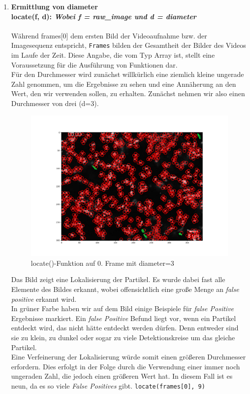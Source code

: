 	\begin{enumerate}
    			\item {\large \textbf{Ermittlung von diameter} \label{kap3_Ermittlung_diameter}}\\
    			\textbf{locate(f, d): \textit{Wobei f = raw\_image und d = diameter}} \\ \\
    			 Während frames[0] dem ersten Bild der Videoaufnahme bzw. der Imagesequenz entspricht, \texttt{Frames} bilden der Gesamtheit der Bilder des Videos im Laufe der Zeit.  Diese Angabe, die vom Typ Array ist, stellt eine Voraussetzung für die Ausführung von Funktionen dar. \\
    			 Für den Durchmesser wird zunächst willkürlich eine ziemlich kleine ungerade Zahl genommen, um die Ergebnisse zu sehen und eine Annäherung an den Wert, den wir verwenden sollen, zu erhalten. Zunächst nehmen wir also einen Durchmesser von drei (d=3).  
    			 
\begin{figure}[H]
    \centering
    \includegraphics[scale=0.35]{Grafiken/trackpyBilder/locate(f0, diameter=3).png}
    \caption{locate()-Funktion auf 0. Frame mit diameter=3}
    \label{fig:kap3_d=3}
\end{figure} 

Das Bild zeigt eine Lokalisierung der Partikel. Es wurde dabei fast alle Elemente des Bildes erkannt, wobei offensichtlich eine große Menge an \textit{\gls{false positive}} erkannt wird.\\
In grüner Farbe haben wir auf dem Bild einige Beispiele für \textit{false Positive} Ergebnisse markiert. 
Ein \textit{false Positive} Befund liegt vor, wenn ein Partikel entdeckt wird, das nicht hätte entdeckt werden dürfen. Denn entweder sind sie zu klein, zu dunkel oder sogar zu viele Detektionskreise um das gleiche Partikel.  
\\
Eine Verfeinerung der Lokalisierung würde somit einen größeren Durchmesser erfordern. Dies erfolgt in der Folge durch die Verwendung einer immer noch ungeraden Zahl, die jedoch einen größeren Wert hat. In diesem Fall ist es neun, da es so viele \textit{False Positives} gibt. 
\texttt{locate(frames[0], 9)}


\end{enumerate}
